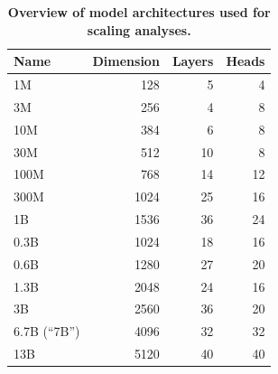 \begin{table}[!ht]
    \centering
        \caption{\textbf{Overview of model architectures used for scaling analyses.}}
    \label{tab:models}
    \begin{tabular}{lrrr}
        \toprule
        Name & Dimension & Layers & Heads \\
        \midrule
        1M & 128 & 5 & 4 \\
        3M & 256 & 4 & 8 \\
        10M & 384 & 6 & 8 \\
        30M & 512 & 10 & 8 \\
        100M & 768 & 14 & 12 \\
        300M & 1024 & 25 & 16 \\
        1B & 1536 & 36 & 24 \\
        \midrule
        0.3B & 1024 & 18 & 16 \\
        0.6B & 1280 & 27 & 20 \\
        1.3B & 2048 & 24 & 16 \\
        3B & 2560 & 36 & 20 \\
        6.7B (``7B'') & 4096 & 32 & 32 \\
        13B & 5120 & 40 & 40 \\
        \bottomrule
    \end{tabular}
\end{table}
